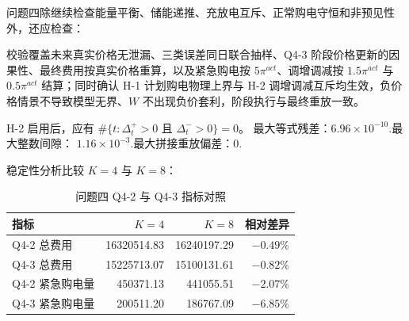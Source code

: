 问题四除继续检查能量平衡、储能递推、充放电互斥、正常购电守恒和非预见性外，还应检查：

校验覆盖未来真实价格无泄漏、三类误差同日联合抽样、Q4-3 阶段价格更新的因果性、最终费用按真实价格重算，以及紧急购电按 \(5\pi^{act}\)、调增调减按 \(1.5\pi^{act}\) 与 \(0.5\pi^{act}\) 结算；同时确认 H-1 计划购电物理上界与 H-2 调增调减互斥均生效，负价格情景不导致模型无界、\(W\) 不出现负价套利，阶段执行与最终重放一致。

H-2 启用后，应有 \(\#\{t:\Delta_t^+>0\text{ 且 }\Delta_t^->0\}=0\)。 最大等式残差：\(6.96\times10^{-10}.\)最大整数间隙：
\(1.16\times10^{-3}.\)最大拼接重放偏差：\(0.\)

稳定性分析比较 \(K=4\) 与 \(K=8\)：

\begin{table}[H]
\centering
{}
\begin{tabular}{lrrr}
\toprule
指标 & \(K=4\) & \(K=8\) & 相对差异 \\
\midrule
Q4-2 总费用 & 16320514.83 & 16240197.29 & $-0.49\%$ \\
Q4-3 总费用 & 15225713.07 & 15100131.61 & $-0.82\%$ \\
Q4-2 紧急购电量 & 450371.13 & 441055.51 & $-2.07\%$ \\
Q4-3 紧急购电量 & 200511.20 & 186767.09 & $-6.85\%$ \\
\bottomrule
\end{tabular}
\caption{问题四 Q4-2 与 Q4-3 指标对照}
\label{tab:13}
\end{table}
